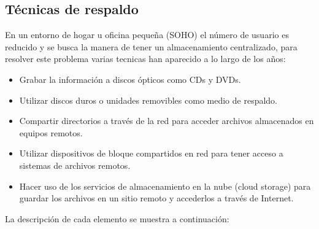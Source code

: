   \subsection {T\'{e}cnicas de respaldo}
  

En un entorno de hogar u oficina peque\~{n}a (SOHO) el n\'{u}mero de usuario es reducido y se busca la manera de tener un almacenamiento centralizado, para resolver este problema varias tecnicas han aparecido a lo largo de los a\~{n}os:

    \begin{itemize}
      \item Grabar la informaci\'{o}n a discos \'{o}pticos como CDs y DVDs.
      \item Utilizar discos duros o unidades removibles como medio de respaldo.
      \item Compartir directorios a trav\'{e}s de la red para acceder archivos almacenados en equipos remotos.
      \item Utilizar dispositivos de bloque compartidos en red para tener acceso a sistemas de archivos remotos.
      \item Hacer uso de los servicios de almacenamiento en la nube (cloud storage) para guardar los archivos en un sitio remoto y accederlos a trav\'{e}s de Internet.
    \end{itemize}

La descripci\'{o}n de cada elemento se muestra a continuaci\'{o}n:


